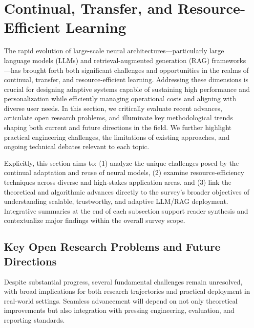 \documentclass[sigconf]{acmart}
\begin{document}
\section{Continual, Transfer, and Resource-Efficient Learning}

The rapid evolution of large-scale neural architectures—particularly large language models (LLMs) and retrieval-augmented generation (RAG) frameworks—has brought forth both significant challenges and opportunities in the realms of continual, transfer, and resource-efficient learning. Addressing these dimensions is crucial for designing adaptive systems capable of sustaining high performance and personalization while efficiently managing operational costs and aligning with diverse user needs. In this section, we critically evaluate recent advances, articulate open research problems, and illuminate key methodological trends shaping both current and future directions in the field. We further highlight practical engineering challenges, the limitations of existing approaches, and ongoing technical debates relevant to each topic.

Explicitly, this section aims to: (1) analyze the unique challenges posed by the continual adaptation and reuse of neural models, (2) examine resource-efficiency techniques across diverse and high-stakes application areas, and (3) link the theoretical and algorithmic advances directly to the survey’s broader objectives of understanding scalable, trustworthy, and adaptive LLM/RAG deployment. Integrative summaries at the end of each subsection support reader synthesis and contextualize major findings within the overall survey scope.

\subsection{Key Open Research Problems and Future Directions}

Despite substantial progress, several fundamental challenges remain unresolved, with broad implications for both research trajectories and practical deployment in real-world settings. Seamless advancement will depend on not only theoretical improvements but also integration with pressing engineering, evaluation, and reporting standards.
\end{document}
